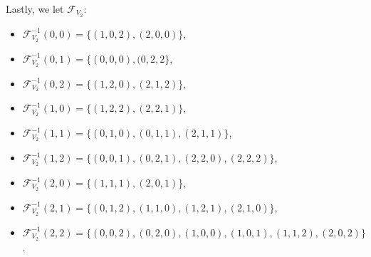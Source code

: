 \documentclass[11pt,a4paper]{article}
\theoremstyle{definition}
\newcommand{\mF}{\mathcal{F}}
\begin{document}
\newpage

Lastly, we let $\mF_{V_2}$:
\begin{itemize}
    \item $\mF_{V_2}^{-1}(0,0) = \{
    (1,0,2), (2,0,0)\}$,
    \item $\mF_{V_2}^{-1}(0,1) = \{
    (0,0,0), (0,2,2\}$,
    \item $\mF_{V_2}^{-1}(0,2) = \{
    (1,2,0),(2,1,2)\}$,
    \item $\mF_{V_2}^{-1}(1,0) = \{
    (1,2,2),(2,2,1)\}$,
    \item $\mF_{V_2}^{-1}(1,1) = \{
    (0,1,0),(0,1,1),(2,1,1)\}$,
    \item $\mF_{V_2}^{-1}(1,2) = \{
    (0,0,1),(0,2,1),(2,2,0),(2,2,2)\}$,
    \item $\mF_{V_2}^{-1}(2,0) = \{
    (1,1,1),(2,0,1)\}$,
    \item $\mF_{V_2}^{-1}(2,1) = \{
    (0,1,2),(1,1,0),(1,2,1),(2,1,0)\}$,
    \item $\mF_{V_2}^{-1}(2,2) = \{
    (0,0,2),(0,2,0),(1,0,0),(1,0,1),(1,1,2),(2,0,2)\}$.
    \end{itemize}
\end{document}
